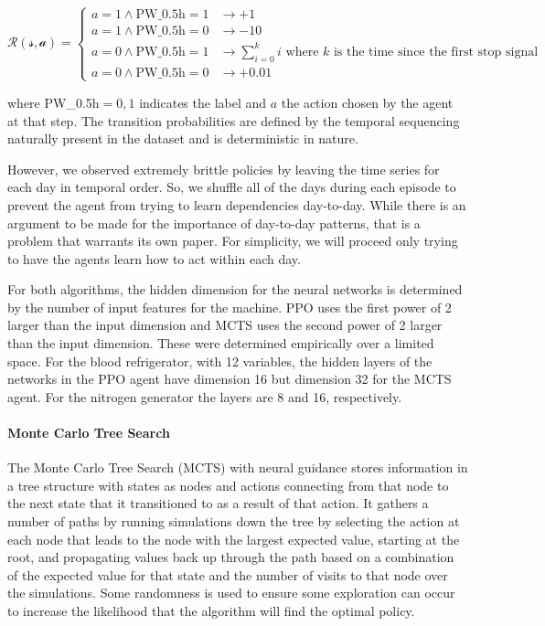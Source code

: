 \documentclass[12pt]{article}
\begin{document}
\[ \mathcal{R(s,a)} =
    \begin{cases}
        a=1 \land \text{PW\_0.5h}=1       &\to +1 \\
        a=1 \land \text{PW\_0.5h}=0       &\to -10 \\
        a=0 \land \text{PW\_0.5h}=1       &\to \sum_{i=0}^k i \text{ where $k$ is the time since the first stop signal} \\
        a=0 \land \text{PW\_0.5h}=0       &\to +0.01
    \end{cases}
\]

where PW\_0.5h$={0,1}$ indicates the label and $a$ the action chosen by the agent at that step. The transition probabilities
are defined by the temporal sequencing naturally present in the dataset and is deterministic in nature.

However, we observed extremely brittle policies by leaving the time series for each day in temporal order. So, we
shuffle all of the days during each episode to prevent the agent from trying to learn dependencies day-to-day. While
there is an argument to be made for the importance of day-to-day patterns, that is a problem that warrants its own
paper. For simplicity, we will proceed only trying to have the agents learn how to act within each day.

For both algorithms, the hidden dimension for the neural networks is determined by the number of input features for the machine.
PPO uses the first power of 2 larger than the input dimension and MCTS uses the second power of 2 larger than the input dimension.
These were determined empirically over a limited space. For the blood refrigerator, with 12 variables, the hidden layers of the
networks in the PPO agent have dimension 16 but dimension 32 for the MCTS agent. For the nitrogen generator the layers are 8 and
16, respectively.

\paragraph{Monte Carlo Tree Search}
The Monte Carlo Tree Search (MCTS) with neural guidance stores information in a tree structure with states as nodes
and actions connecting from that node to the next state that it transitioned to as a result of that action. It
gathers a number of paths by running simulations down the tree by selecting the action at each node that leads to
the node with the largest expected value, starting at the root, and propagating values back up
through the path based on a combination of the expected value for that state and the number of visits to that node
over the simulations. Some randomness is used to ensure some exploration can occur to increase the likelihood that
the algorithm will find the optimal policy.
\end{document}
